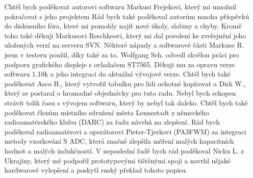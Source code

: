 Chtěl bych poděkovat autorovi softwaru Markusi Frejekovi, který mi umožnil pokračovat s jeho projektem
Rád bych také poděkoval autorům mnoha příspěvků do diskusního fóra, které mi pomohly najít nové úkoly,
slabiny a chyby.
Kromě toho také děkuji Markusovi Reschkeovi, který mi dal povolení ke zveřejnění jeho uložených verzí
na serveru SVN. Některé nápady a softwarové části Markuse R. jsem v testeru použil, díky také za to.
Wolfgang Sch. odvedl skvělou práci pro podporu grafického displeje s ovladačem ST7565.
Děkuji mu za opravu verze softwaru 1.10k a jeho integraci do aktuální vývojové verze.
Chtěl bych také poděkovat Asco B., který vytvořil tabulku pro lidi ochotné kopírovat a Dirk W.,
který se postaral o hromadné objednávky pro tuto radu.
Nebyl bych schopen strávit tolik času s vývojem softwaru, který by nebyl tak daleko.
Chtěl bych také poděkovat členům místního sdružení města Lennestadt z německého radioamatérského 
klubu (DARC) za řadu návrhů na zlepšení.
Rád bych poděkoval radioamatérovi a operátorovi Pieter-Tjerkovi (PA3FWM) za integraci metody vzorkování S ADC,
která značně zlepšila měření malých kapacitních hodnot a malých indukčností.
V neposlední řadě bych rád poděkoval Nicku L. z Ukrajiny, který mě podpořil prototypovými
tištěnými spoji a navrhl nějaké hardwarové vylepšení a poskytl ruský překlad tohoto popisu.
